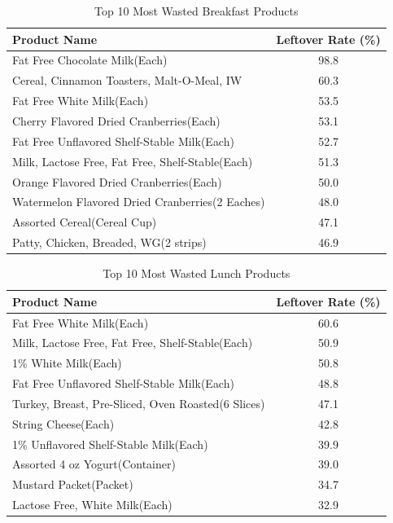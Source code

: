 \documentclass[journal]{IEEEtran}
\begin{document}
\begin{table}[t]
  \centering
  \caption{Top 10 Most Wasted Breakfast Products}
  \label{tab:breakfast_waste}
  \begin{tabular}{l S[table-format=2.1]}
    \toprule
    Product Name & {Leftover Rate (\%)} \\
    \midrule
    Fat Free Chocolate Milk(Each) & 98.8 \\
    Cereal, Cinnamon Toasters, Malt-O-Meal, IW & 60.3 \\
    Fat Free White Milk(Each) & 53.5 \\
    Cherry Flavored Dried Cranberries(Each) & 53.1 \\
    Fat Free Unflavored Shelf-Stable Milk(Each) & 52.7 \\
    Milk, Lactose Free,  Fat Free, Shelf-Stable(Each) & 51.3 \\
    Orange Flavored Dried Cranberries(Each) & 50.0 \\
    Watermelon Flavored Dried Cranberries(2 Eaches) & 48.0 \\
    Assorted Cereal(Cereal Cup) & 47.1 \\
    Patty, Chicken, Breaded, WG(2 strips) & 46.9 \\
    \bottomrule
  \end{tabular}
\end{table}

\begin{table}[t]
  \centering
  \caption{Top 10 Most Wasted Lunch Products}
  \label{tab:lunch_waste}
  \begin{tabular}{l S[table-format=2.1]}
    \toprule
    Product Name & {Leftover Rate (\%)} \\
    \midrule
    Fat Free White Milk(Each) & 60.6 \\
    Milk, Lactose Free,  Fat Free, Shelf-Stable(Each) & 50.9 \\
    1\% White Milk(Each) & 50.8 \\
    Fat Free Unflavored Shelf-Stable Milk(Each) & 48.8 \\
    Turkey,  Breast, Pre-Sliced, Oven Roasted(6 Slices) & 47.1 \\
    String Cheese(Each) & 42.8 \\
    1\% Unflavored Shelf-Stable Milk(Each) & 39.9 \\
    Assorted  4 oz Yogurt(Container) & 39.0 \\
    Mustard Packet(Packet) & 34.7 \\
    Lactose Free, White Milk(Each) & 32.9 \\
    \bottomrule
  \end{tabular}
\end{table}
\end{document}
